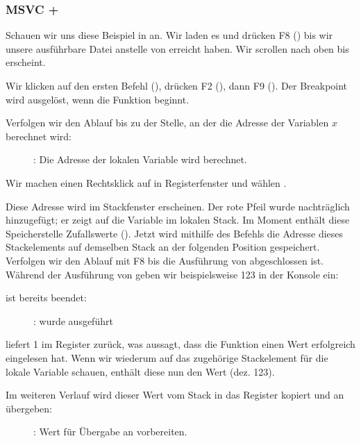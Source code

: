 \clearpage
\subsubsection{MSVC + \olly}
\myindex{\olly}
Schauen wir uns diese Beispiel in \olly an.
Wir laden es und drücken F8 (\stepover) bis wir unsere ausführbare Datei anstelle von  erreicht haben. Wir scrollen nach oben bis \main erscheint.

Wir klicken auf den ersten Befehl (), drücken F2 (), dann F9 (). Der Breakpoint wird ausgelöst, wenn die Funktion \main beginnt.

Verfolgen wir den Ablauf bis zu der Stelle, an der die Adresse der Variablen $x$ berechnet wird:

\begin{figure}[H]
\centering
{}
\caption{\olly: Die Adresse der lokalen Variable wird berechnet.}
\label{fig:scanf_ex1_olly_1}
\end{figure}

Wir machen einen Rechtsklick auf \EAX in Registerfenster und wählen . 

Diese Adresse wird im Stackfenster erscheinen. Der rote Pfeil wurde nachträglich hinzugefügt; er zeigt auf die Variable im lokalen Stack. Im Moment enthält diese Speicherstelle Zufallswerte (). Jetzt wird mithilfe des \PUSH Befehls die Adresse dieses Stackelements auf demselben Stack an der folgenden Position gespeichert. 
Verfolgen wir den Ablauf mit F8 bis die Ausführung von \scanf abgeschlossen ist. Während der Ausführung von \scanf geben wir beispielsweise 123 in der Konsole ein:



\clearpage
\scanf ist bereits beendet:

\begin{figure}[H]
\centering
{}
\caption{\olly: \scanf wurde ausgeführt}
\label{fig:scanf_ex1_olly_3}
\end{figure}

\scanf liefert 1 im \EAX Register zurück, was aussagt, dass die Funktion einen Wert erfolgreich eingelesen hat. Wenn wir wiederum auf das zugehörige Stackelement für die lokale Variable schauen, enthält diese nun den Wert  (dez. 123).

\clearpage
Im weiteren Verlauf wird dieser Wert vom Stack in das \ECX Register kopiert und an \printf übergeben:

\begin{figure}[H]
\centering
{}
\caption{\olly: Wert für Übergabe an \printf vorbereiten.}
\label{fig:scanf_ex1_olly_4}
\end{figure}

